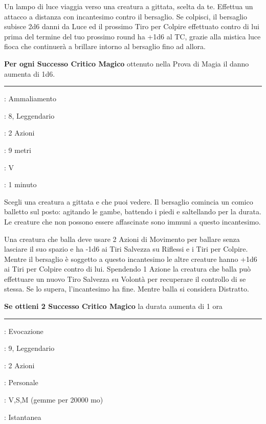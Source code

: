 \begin{multicols}{2}
Un lampo di luce viaggia verso una creatura a gittata, scelta da te. Effettua un attacco a distanza con incantesimo contro il bersaglio. Se colpisci, il bersaglio subisce 2d6 danni da Luce ed il prossimo Tiro per Colpire effettuato contro di lui prima del termine del tuo prossimo round ha +1d6 al TC, grazie alla mistica luce fioca che continuerà a brillare intorno al bersaglio fino ad allora.

\textbf{Per ogni Successo Critico Magico} ottenuto nella Prova di Magia il danno aumenta di 1d6.

\smallskip\noindent\rule{\linewidth}{2pt} \hypertarget{Danza Irresistibile}{}\medskip{}
\noindent
\begin{description}[noitemsep, topsep=0pt, parsep=0pt, partopsep=0pt, leftmargin=0cm, labelwidth=2.8cm]
	\item[\textbf{Lista di Magia}]: Ammaliamento
	\item[\textbf{Livello}]: 8, Leggendario
	\item[\textbf{T. di Lancio}]: 2 Azioni
	\item[\textbf{Gittata}]: 9 metri
	\item[\textbf{Componenti}]: V
	\item[\textbf{Durata}]: 1 minuto
\end{description}

Scegli una creatura a gittata e che puoi vedere. Il bersaglio comincia un comico balletto sul posto: agitando le gambe, battendo i piedi e saltellando per la durata. Le creature che non possono essere affascinate sono immuni a questo incantesimo.

Una creatura che balla deve usare 2 Azioni di Movimento per ballare senza lasciare il suo spazio e ha -1d6 ai Tiri Salvezza su Riflessi e i Tiri per Colpire. Mentre il bersaglio è soggetto a questo incantesimo le altre creature hanno +1d6 ai Tiri per Colpire contro di lui. Spendendo 1 Azione la creatura che balla può effettuare un nuovo Tiro Salvezza su Volontà per recuperare il controllo di se stessa. Se lo supera, l'incantesimo ha fine. Mentre balla si considera Distratto.

\textbf{Se ottieni 2 Successo Critico Magico} la durata aumenta di 1 ora

\smallskip\noindent\rule{\linewidth}{2pt} \hypertarget{Desiderio}{}\medskip{}
\noindent
\begin{description}[noitemsep, topsep=0pt, parsep=0pt, partopsep=0pt, leftmargin=0cm, labelwidth=2.8cm]
	\item[\textbf{Lista di Magia}]: Evocazione
	\item[\textbf{Livello}]: 9, Leggendario
	\item[\textbf{T. di Lancio}]: 2 Azioni
	\item[\textbf{Gittata}]: Personale
	\item[\textbf{Componenti}]: V,S,M (gemme per 20000 mo)
	\item[\textbf{Durata}]: Istantanea
\end{description}


\end{multicols}
